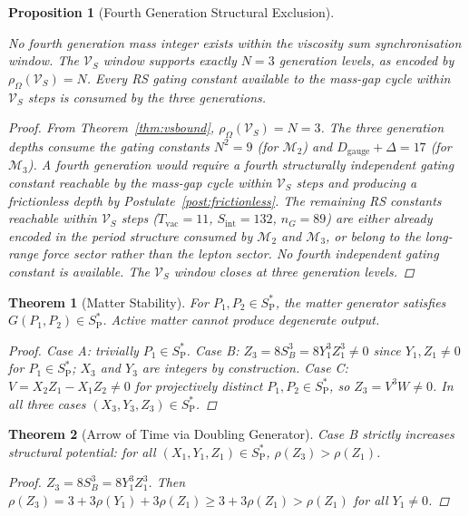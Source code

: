 \documentclass[11pt, letterpaper]{article}
\newcommand{\SPs}{S_{\mathrm{P}}^{*}}
\newcommand{\rank}{\rho}
\newcommand{\Dg}{D_{\mathrm{gauge}}}
\newcommand{\Sint}{S_{\mathrm{int}}}
\newcommand{\VS}{\mathcal{V}_S}
\theoremstyle{definition}
\theoremstyle{plain}
\newtheorem{theorem}{Theorem}[section]
\newtheorem{proposition}{Proposition}[section]
\begin{document}
\begin{proposition}[Fourth Generation Structural Exclusion]\label{prop:gen4}
\begin{rsbox}
No fourth generation mass integer exists within the viscosity sum synchronisation window. The $\VS$ window supports exactly $N = 3$ generation levels, as encoded by $\rho_\Omega(\VS) = N$. Every RS gating constant available to the mass-gap cycle within $\VS$ steps is consumed by the three generations.
\end{rsbox}
\begin{proof}
From Theorem~\ref{thm:vsbound}, $\rho_\Omega(\VS) = N = 3$. The three generation depths consume the gating constants $N^2 = 9$ (for $\mathcal{M}_2$) and $\Dg + \Delta = 17$ (for $\mathcal{M}_3$). A fourth generation would require a fourth structurally independent gating constant reachable by the mass-gap cycle within $\VS$ steps and producing a frictionless depth by Postulate~\ref{post:frictionless}. The remaining RS constants reachable within $\VS$ steps ($T_{\mathrm{vac}} = 11$, $\Sint = 132$, $n_G = 89$) are either already encoded in the period structure consumed by $\mathcal{M}_2$ and $\mathcal{M}_3$, or belong to the long-range force sector rather than the lepton sector. No fourth independent gating constant is available. The $\VS$ window closes at three generation levels.
\end{proof}
\end{proposition}

\begin{theorem}[Matter Stability]\label{thm:matter-stability}
For $P_1,P_2\in\SPs$, the matter generator satisfies $G(P_1,P_2)\in\SPs$.
Active matter cannot produce degenerate output.
\begin{proof}
Case A: trivially $P_1\in\SPs$.  Case B: $Z_3=8S_B^3=8Y_1^3Z_1^3\neq 0$
since $Y_1,Z_1\neq 0$ for $P_1\in\SPs$; $X_3$ and $Y_3$ are integers by
construction.  Case C: $V=X_2Z_1-X_1Z_2\neq 0$ for projectively distinct
$P_1,P_2\in\SPs$, so $Z_3=V^3W\neq 0$.  In all three cases
$(X_3,Y_3,Z_3)\in\SPs$.
\end{proof}
\end{theorem}

\begin{theorem}[Arrow of Time via Doubling Generator]\label{thm:arrow-doubling}
Case B strictly increases structural potential: for all $(X_1,Y_1,Z_1)\in\SPs$,
$\rank(Z_3)>\rank(Z_1)$.
\begin{proof}
$Z_3=8S_B^3=8Y_1^3Z_1^3$.  Then
$\rank(Z_3)=3+3\rank(Y_1)+3\rank(Z_1)\geq 3+3\rank(Z_1)>\rank(Z_1)$
for all $Y_1\neq 0$.
\end{proof}
\end{theorem}
\end{document}
